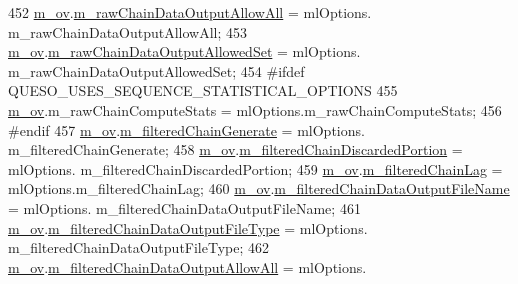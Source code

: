 \begin{DoxyCode}
452   \hyperlink{class_q_u_e_s_o_1_1_metropolis_hastings_s_g_options_a9d4792d9fc2dc5439b8ab489b0c236eb}{m\_ov}.\hyperlink{class_q_u_e_s_o_1_1_mh_options_values_a7bd5a3926443946479ea617918d6723f}{m\_rawChainDataOutputAllowAll}                = mlOptions.
      m\_rawChainDataOutputAllowAll;
453   \hyperlink{class_q_u_e_s_o_1_1_metropolis_hastings_s_g_options_a9d4792d9fc2dc5439b8ab489b0c236eb}{m\_ov}.\hyperlink{class_q_u_e_s_o_1_1_mh_options_values_a99f722385d57bcb24542f3969c3764cd}{m\_rawChainDataOutputAllowedSet}              = mlOptions.
      m\_rawChainDataOutputAllowedSet;
454 \textcolor{preprocessor}{#ifdef QUESO\_USES\_SEQUENCE\_STATISTICAL\_OPTIONS}
455 \textcolor{preprocessor}{}  \hyperlink{class_q_u_e_s_o_1_1_metropolis_hastings_s_g_options_a9d4792d9fc2dc5439b8ab489b0c236eb}{m\_ov}.m\_rawChainComputeStats                      = mlOptions.m\_rawChainComputeStats;
456 \textcolor{preprocessor}{#endif}
457 \textcolor{preprocessor}{}  \hyperlink{class_q_u_e_s_o_1_1_metropolis_hastings_s_g_options_a9d4792d9fc2dc5439b8ab489b0c236eb}{m\_ov}.\hyperlink{class_q_u_e_s_o_1_1_mh_options_values_afe02816132a862e807ea3675b4125ccb}{m\_filteredChainGenerate}                     = mlOptions.
      m\_filteredChainGenerate;
458   \hyperlink{class_q_u_e_s_o_1_1_metropolis_hastings_s_g_options_a9d4792d9fc2dc5439b8ab489b0c236eb}{m\_ov}.\hyperlink{class_q_u_e_s_o_1_1_mh_options_values_afdaa37947c3a5c5acc11b89fa0a98fb9}{m\_filteredChainDiscardedPortion}             = mlOptions.
      m\_filteredChainDiscardedPortion;
459   \hyperlink{class_q_u_e_s_o_1_1_metropolis_hastings_s_g_options_a9d4792d9fc2dc5439b8ab489b0c236eb}{m\_ov}.\hyperlink{class_q_u_e_s_o_1_1_mh_options_values_abd87b32b15f3ce695d910b48d837094f}{m\_filteredChainLag}                          = mlOptions.m\_filteredChainLag;
460   \hyperlink{class_q_u_e_s_o_1_1_metropolis_hastings_s_g_options_a9d4792d9fc2dc5439b8ab489b0c236eb}{m\_ov}.\hyperlink{class_q_u_e_s_o_1_1_mh_options_values_a337b2f1161814f1c52153cbe7706f59a}{m\_filteredChainDataOutputFileName}           = mlOptions.
      m\_filteredChainDataOutputFileName;
461   \hyperlink{class_q_u_e_s_o_1_1_metropolis_hastings_s_g_options_a9d4792d9fc2dc5439b8ab489b0c236eb}{m\_ov}.\hyperlink{class_q_u_e_s_o_1_1_mh_options_values_adc3052dc0f1c2fd5072cb415a0eb3265}{m\_filteredChainDataOutputFileType}           = mlOptions.
      m\_filteredChainDataOutputFileType;
462   \hyperlink{class_q_u_e_s_o_1_1_metropolis_hastings_s_g_options_a9d4792d9fc2dc5439b8ab489b0c236eb}{m\_ov}.\hyperlink{class_q_u_e_s_o_1_1_mh_options_values_a249e8720b4570d5f4e6504a29a84ac04}{m\_filteredChainDataOutputAllowAll}           = mlOptions.

\end{DoxyCode}
